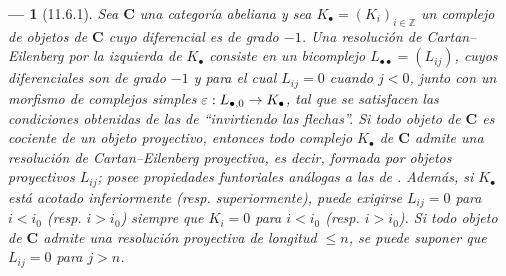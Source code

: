 \documentclass[10pt,oneside,openany]{book}
\theoremstyle{egaenv}\newtheorem*{env}{---}
\theoremstyle{egastatement}
\theoremstyle{egadescription}
\renewcommand{\leq}{\leqslant}
\renewcommand{\to}{\mathchoice{\longrightarrow}{\rightarrow}{\rightarrow}{\rightarrow}}
\begin{document}
\begin{env}[11.6.1]
\label{0.11.6.1}
\label{0.11.6.1-fr}
Sea $\boldsymbol{C}$ una categoría abeliana y sea $K_\bullet=(K_i)_{i\in\mathbb Z}$ un complejo de objetos de $\boldsymbol{C}$ cuyo diferencial es de grado $-1$.
Una \emph{resolución de Cartan--Eilenberg por la izquierda} de $K_\bullet$ consiste en un bicomplejo $L_{\bullet\bullet}=(L_{ij})$, cuyos diferenciales son de grado $-1$ y para el cual $L_{ij}=0$ cuando $j<0$, junto con un morfismo de complejos simples
$\varepsilon:L_{\bullet,0}\to K_\bullet$,
tal que se satisfacen las condiciones obtenidas de las de  ``invirtiendo las flechas''.
Si todo objeto de $\boldsymbol{C}$ es cociente de un objeto proyectivo, entonces todo complejo $K_\bullet$ de $\boldsymbol{C}$ admite una \emph{resolución de Cartan--Eilenberg proyectiva}, es decir, formada por objetos proyectivos $L_{ij}$; posee propiedades funtoriales análogas a las de .
Además, si $K_\bullet$ está acotado inferiormente (resp. superiormente), puede exigirse $L_{ij}=0$ para $i<i_0$ (resp. $i>i_0$) siempre que $K_i=0$ para $i<i_0$ (resp. $i>i_0$).
Si todo objeto de $\boldsymbol{C}$ admite una resolución proyectiva de longitud $\leq n$, se puede suponer que $L_{ij}=0$ para $j>n$.
\end{env}
\end{document}
